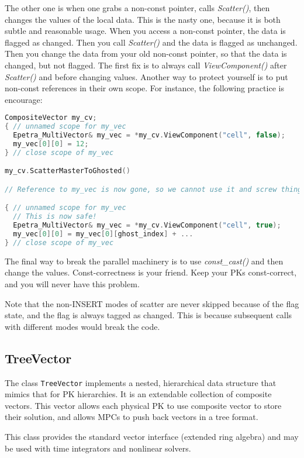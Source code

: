 The other one is when one grabs a non-const pointer, calls {\it Scatter()}, then 
changes the values of the local data.  
This is the nasty one, because it is both subtle and reasonable usage.
When you access a non-const pointer, the data is flagged as changed.
Then you call {\it Scatter()} and the data is flagged as unchanged.
Then you change the data from your old non-const pointer, so that the data is changed, but not flagged.
The first fix is to always call {\it ViewComponent()} after {\it Scatter()} and before changing values.
Another way to protect yourself is to put non-const references in their own scope.
For instance, the following practice is encourage:
\begin{lstlisting}[language=C++]
CompositeVector my_cv;
{ // unnamed scope for my_vec
  Epetra_MultiVector& my_vec = *my_cv.ViewComponent("cell", false);
  my_vec[0][0] = 12;
} // close scope of my_vec

my_cv.ScatterMasterToGhosted()

// Reference to my_vec is now gone, so we cannot use it and screw things up!

{ // unnamed scope for my_vec
  // This is now safe!
  Epetra_MultiVector& my_vec = *my_cv.ViewComponent("cell", true);
  my_vec[0][0] = my_vec[0][ghost_index] + ...
} // close scope of my_vec
\end{lstlisting}

The final way to break the parallel machinery is to use {\it const\_cast()} and 
then change the values.
Const-correctness is your friend. Keep your PKs const-correct, and you will never have this problem.

Note that the non-{\rm INSERT} modes of scatter are never skipped because of the flag state, 
and the flag is always tagged as changed.  
This is because subsequent calls with different modes would break the code.


\subsection{TreeVector}
The class {\tt TreeVector} implements a nested, hierarchical data structure 
that mimics that for PK hierarchies.
It is an extendable collection of composite vectors.
This vector allows each physical PK to use composite vector to store 
their solution, and allows MPCs to push back vectors in a tree format.

This class provides the standard vector interface (extended ring algebra) and 
may be used with time integrators and nonlinear solvers.


